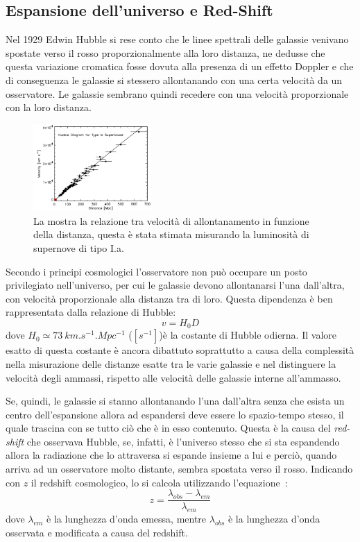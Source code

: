 \subsection{Espansione dell'universo e Red-Shift}\label{sec:espansione}

Nel 1929 Edwin Hubble si rese conto che le linee spettrali delle galassie venivano spostate verso il rosso proporzionalmente alla loro distanza, ne dedusse che questa variazione cromatica fosse dovuta alla  presenza di un effetto Doppler e che di conseguenza le galassie si stessero allontanando con una certa velocità da un osservatore. Le galassie sembrano quindi recedere con una velocità proporzionale con la loro distanza.

\begin{figure}
    \centering
    \includegraphics[width=0.4\textwidth]{immagini/redshift.png}
    \caption{La mostra la relazione tra velocità di allontanamento in funzione della distanza, questa è stata stimata misurando la luminosità di supernove di tipo I.a.}\label{fig:redshift}
\end{figure}

Secondo i principi cosmologici l'osservatore non può occupare un posto privilegiato nell'universo, per cui le galassie devono allontanarsi l'una dall'altra, con velocità proporzionale alla distanza tra di loro. Questa dipendenza è ben rappresentata dalla relazione di Hubble:
\begin{equation}\label{eq:hubble}
    v = H_0 D
\end{equation}
dove $H_0 \simeq \SI{73}{km.s^{-1}.Mpc^{-1}}$ ($[s^{-1}]$)è la costante di Hubble odierna. Il valore esatto di questa costante è ancora dibattuto soprattutto a causa della complessità nella misurazione delle distanze esatte tra le varie galassie e nel distinguere la velocità degli ammassi, rispetto alle velocità delle galassie interne all'ammasso.

Se, quindi, le galassie si stanno allontanando l'una dall'altra senza che esista un centro dell'espansione allora ad espandersi deve essere lo spazio-tempo stesso, il quale trascina con se tutto ciò che è in esso contenuto. Questa è la causa del \textit{red-shift} che osservava Hubble, se, infatti, è l'universo stesso che si sta espandendo allora la radiazione che lo attraversa si espande insieme a lui e perciò, quando arriva ad un osservatore molto distante, sembra spostata verso il rosso. Indicando con $z$ il redshift cosmologico, lo si calcola utilizzando l'equazione~:
\begin{equation}\label{eq:redshift}
    z = \frac{\lambda_{obs} - \lambda_{em}}{\lambda_{em}}
\end{equation}
dove $\lambda_{em}$ è la lunghezza d'onda emessa, mentre $\lambda_{obs}$ è la lunghezza d'onda osservata e modificata a causa del redshift.

